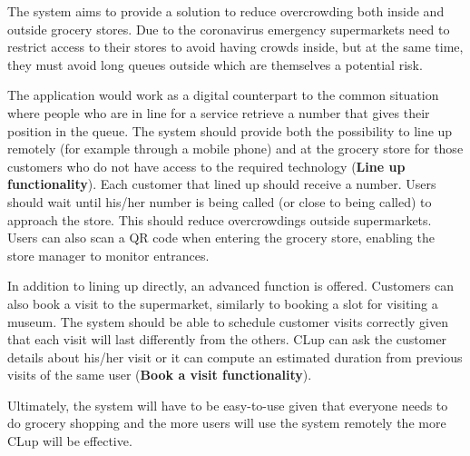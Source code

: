 The system aims to provide a solution to reduce overcrowding both inside and outside grocery stores.
Due to the coronavirus emergency supermarkets need to restrict access to their stores to avoid having crowds inside, but at the same time, they must avoid long queues outside which are themselves a potential risk.

\medskip
The application would work as a digital counterpart to the common situation where people who are in line for a service retrieve a number that gives their position in the queue.
The system should provide both the possibility to line up remotely (for example through a mobile phone) and at the grocery store for those customers who do not have access to the required technology (\textbf{Line up functionality}).
Each customer that lined up should receive a number. Users should wait until his/her number is being called (or close to being called) to approach the store. This should reduce overcrowdings outside supermarkets.
Users can also scan a QR code when entering the grocery store, enabling the store manager to monitor entrances.

\medskip
In addition to lining up directly, an advanced function is offered. Customers can also book a visit to the supermarket, similarly to booking a slot for visiting a museum. The system should be able to schedule customer visits correctly given that each visit will last differently from the others.  
CLup can ask the customer details about his/her visit or it can compute an estimated duration from previous visits of the same user (\textbf{Book a visit functionality}).

\medskip
Ultimately, the system will have to be easy-to-use given that everyone needs to do grocery shopping and the more users will use the system remotely the more CLup will be effective.

